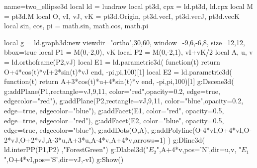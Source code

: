 \documentclass[border=5pt]{standalone}%
\begin{document}
\begin{luadraw}{name=two_ellipse3d}
local ld = luadraw
local pt3d, cpx = ld.pt3d, ld.cpx
local M = pt3d.M
local O, vI, vJ, vK = pt3d.Origin, pt3d.vecI, pt3d.vecJ, pt3d.vecK
local sin, cos, pi = math.sin, math.cos, math.pi

local g = ld.graph3d:new{ viewdir={"ortho",30,60}, window={-9,6,-6,8},
    size={12,12}, bbox=true }
local P1 = {M(0,-2,0), vK}
local P2 = {M(0,-2,1), vI+vK/2}
local A, u, v = ld.orthoframe(P2,vJ)
local E1 = ld.parametric3d( function(t) return O+4*cos(t)*vI+2*sin(t)*vJ end, -pi,pi,100)[1]
local E2 = ld.parametric3d( function(t) return A+3*cos(t)*u+4*sin(t)*v end, -pi,pi,100)[1]
g:Dscene3d(
    g:addPlane(P1,{rectangle={vJ,9,11}, color="red",opacity=0.2, edge=true, edgecolor="red"}),
    g:addPlane(P2,{rectangle={vJ,9,11}, color="blue",opacity=0.2, edge=true, edgecolor="blue"}),
    g:addFacet(E1, {color="red", opacity=0.5, edge=true, edgecolor="red"}),
    g:addFacet(E2, {color="blue", opacity=0.5, edge=true, edgecolor="blue"}),
    g:addDots({O,A}),
    g:addPolyline({{O-4*vI,O+4*vI},{O-2*vJ,O+2*vJ},{A-3*u,A+3*u},{A-4*v,A+4*v}},{arrows=1})
)
g:Dline3d( ld.interPP(P1,P2) ,"ForestGreen")
g:Dlabel3d("$E_2$",A+4*v,{pos='N',dir={u,v}}, "$E_1$",O+4*vI,{pos='S',dir={vJ,-vI}})
g:Show()
\end{luadraw}
\end{document}
